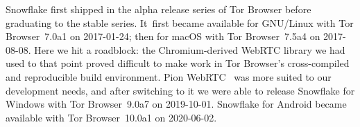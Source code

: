 \documentclass[letterpaper,twocolumn]{article}
\begin{document}
Snowflake first shipped in the alpha release series of Tor Browser
before graduating to the stable series.
It~first became available for GNU/Linux
with Tor Browser~7.0a1 on \mbox{2017-01-24};
then for macOS
with Tor Browser~7.5a4 on \mbox{2017-08-08}.
Here we hit a roadblock:
the Chromium-derived WebRTC library we had used to that point
proved difficult to make work in Tor Browser's
cross-compiled and reproducible build environment.
Pion WebRTC~\cite{pion-webrtc} was more suited to our development needs,
and after switching to it we were able to release
Snowflake for Windows
with Tor Browser~9.0a7 on \mbox{2019-10-01}.
Snowflake for Android became available with
Tor Browser~10.0a1 on \mbox{2020-06-02}.
\end{document}
